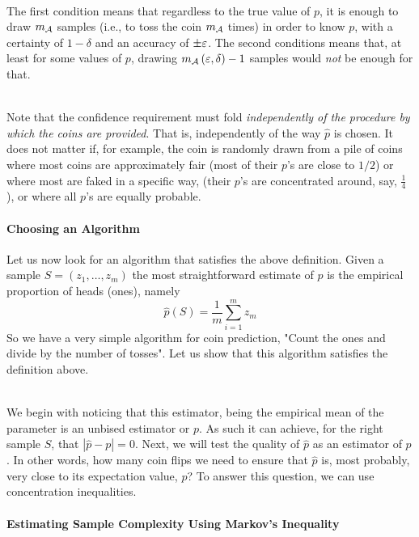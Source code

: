~\\The first condition means that regardless to the true value of $p$, it is enough to draw $m_{\mathcal{A}}$ samples (i.e., to toss the coin $m_{\mathcal{A}}$ times) in order to know $p$, with a certainty of $1-\delta$ and an accuracy of $\pm \varepsilon$. The second conditions means that, at least for some values of $p$, drawing $m_{\mathcal{A}}\left(\varepsilon,\delta\right)-1$ samples would \textit{not} be enough for that.

~\\Note that the confidence requirement must fold \emph{independently of the procedure by which the coins are provided}. That is, independently of the way $\widehat{p}$ is chosen. It does not matter if, for example, the coin is randomly drawn from a pile of coins where most coins are approximately fair (most of their $p$'s are close to $1/2$) or where most are faked in a specific way, (their $p$'s are concentrated around, say, $\frac{1}{4}$ ),  or where all $p$'s are equally probable.

\paragraph{Choosing an Algorithm}

Let us now look for an algorithm that satisfies the above definition. Given a sample $S=\left(z_1, \ldots, z_m\right)$ the most straightforward estimate of $p$ is the empirical proportion of heads (ones), namely
$$\widehat{p}\left(S\right)=\frac{1}{m} \sum_{i=1} ^m z_m$$
So we have a very simple algorithm for coin prediction, "Count the ones and divide by the number of tosses". Let us show that this algorithm satisfies the definition above.

~\\We begin with noticing that this estimator, being the empirical mean of the parameter is an unbised estimator or $p$. As such it can achieve, for the right sample $S$, that $\left|\widehat{p}-p\right| = 0$. Next, we will test the quality of $\widehat{p}$ as an estimator of $p$. In other words, how many coin flips we need to ensure that $\widehat{p}$ is, most probably, very close to its expectation value, $p$? To answer this question, we can use concentration inequalities.

\paragraph{Estimating Sample Complexity Using Markov's Inequality}

